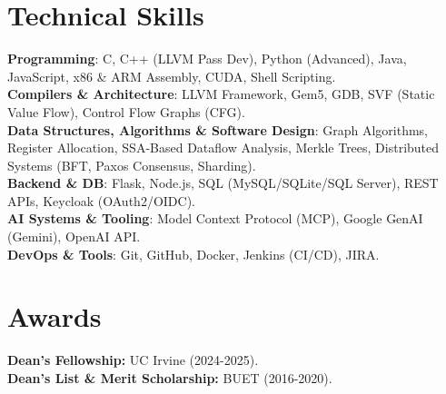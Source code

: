 \documentclass[letterpaper,11pt]{article}
\begin{document}
\section{Technical Skills}
 \begin{itemize}[leftmargin=0.15in, label={}]
    \small{\item{
     \textbf{Programming}{: C, C++ (LLVM Pass Dev), Python (Advanced), Java, JavaScript, x86 \& ARM Assembly, CUDA, Shell Scripting.} \\
     \textbf{Compilers \& Architecture}{: LLVM Framework, Gem5, GDB, SVF (Static Value Flow), Control Flow Graphs (CFG).} \\
     \textbf{Data Structures, Algorithms \& Software Design}{: Graph Algorithms, Register Allocation, SSA-Based Dataflow Analysis, Merkle Trees, Distributed Systems (BFT, Paxos Consensus, Sharding).} \\
     \textbf{Backend \& DB}{: Flask, Node.js, SQL (MySQL/SQLite/SQL Server), REST APIs, Keycloak (OAuth2/OIDC).} \\
     \textbf{AI Systems \& Tooling}{: Model Context Protocol (MCP), Google GenAI (Gemini), OpenAI API.} \\
     \textbf{DevOps \& Tools}{: Git, GitHub, Docker, Jenkins (CI/CD), JIRA.}
    }}
 \end{itemize}


\section{Awards}
 \begin{itemize}[leftmargin=0.15in, label={}]
    \small{\item{
     \textbf{Dean's Fellowship:} UC Irvine (2024-2025). \\
     \textbf{Dean's List \& Merit Scholarship:} BUET (2016-2020).
    }}
 \end{itemize}

\end{document}
